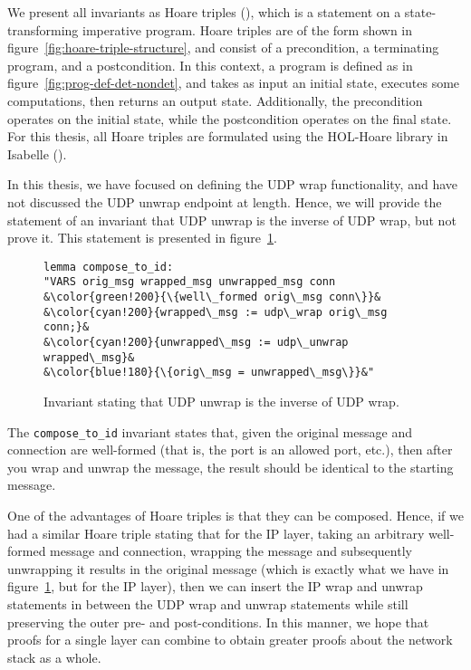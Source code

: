 \documentclass[twoside]{memoir}
\begin{document}
We present all invariants as Hoare triples (\cite{hoare-triple}), which is a 
statement on a state-transforming imperative program.
Hoare triples are of the form shown in figure~\ref{fig:hoare-triple-structure},
and consist of a precondition, a terminating program, and a postcondition.
In this context, a program is defined as in figure~\ref{fig:prog-def-det-nondet},
and takes as input an initial state, executes some computations, then returns
an output state.
Additionally, the precondition operates on the initial state, while the 
postcondition operates on the final state.
For this thesis, all Hoare triples are formulated using the HOL-Hoare
library in Isabelle (\cite{hol-hoare-lib}).


In this thesis, we have focused on defining the UDP wrap functionality,
and have not discussed the UDP unwrap endpoint at length.
Hence, we will provide the statement of an invariant 
that UDP unwrap is the inverse of UDP wrap, but not prove it.
This statement is presented in figure~\ref{fig:inv-unwrap-wrap}.


\begin{figure}[htpb]
    \centering
\begin{lstlisting}[language=isabelle]
lemma compose_to_id:
"VARS orig_msg wrapped_msg unwrapped_msg conn
&\color{green!200}{\{well\_formed orig\_msg conn\}}&
&\color{cyan!200}{wrapped\_msg := udp\_wrap orig\_msg conn;}&
&\color{cyan!200}{unwrapped\_msg := udp\_unwrap wrapped\_msg}&
&\color{blue!180}{\{orig\_msg = unwrapped\_msg\}}&"
\end{lstlisting}
    \caption{Invariant stating that UDP unwrap is the inverse of UDP wrap.}
    \label{fig:inv-unwrap-wrap}
\end{figure}

The \lstinline{compose_to_id} invariant states that, given the original message
and connection are well-formed (that is, the port is an allowed port, etc.),
then after you wrap and unwrap the message, the result should
be identical to the starting message.

One of the advantages of Hoare triples is that they can be composed.
Hence, if we had a similar Hoare triple stating that for the IP layer,
taking an arbitrary well-formed message and connection,
wrapping the message and subsequently unwrapping it results in the original
message (which is exactly what we have in figure~\ref{fig:inv-unwrap-wrap},
but for the IP layer), then we can insert the IP wrap and unwrap
statements in between the UDP wrap and unwrap statements while
still preserving the outer pre- and post-conditions.
In this manner, we hope that proofs for a single layer can combine
to obtain greater proofs about the network stack as a whole.
\end{document}
